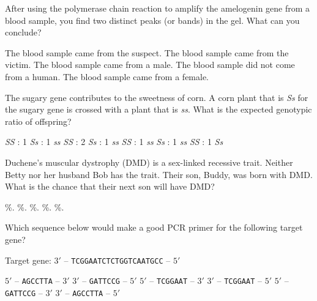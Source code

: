 \question
After using the polymerase chain reaction to amplify the amelogenin gene from a blood sample, you find two distinct peaks (or bands) in the gel.  What can you conclude?

\begin{choices}
\choice The blood sample came from the suspect.
\choice The blood sample came from the victim.
\correctchoice The blood sample came from a male.
\choice The blood sample did not come from a human.
\choice The blood sample came from a female.
\end{choices}

\newpage

\question
The sugary gene contributes to the sweetness of corn. A corn plant that is \textit{Ss} for the sugary gene is crossed with a plant that is \textit{ss}. What is the expected genotypic ratio of offspring?

\begin{choices}
 \textit{SS} : 1 \textit{Ss} : 1 \textit{ss}
 \textit{SS} : 2 \textit{Ss} : 1 \textit{ss}
 \textit{SS} : 1 \textit{ss}
 \textit{Ss} : 1 \textit{ss}
 \textit{SS} : 1 \textit{Ss}
\end{choices}

\question
Duchene's muscular dystrophy (DMD) is a sex-linked recessive trait. Neither Betty nor her husband Bob has the trait. Their son, Buddy, was born with DMD. What is the chance that their next son will have DMD?

\begin{choices}
\%.
\%.
\%.
\%.
\%.
\end{choices}

\question
Which sequence below would make a good PCR primer for the following target gene?

\vspace{0.4\baselineskip}
Target gene: $3'$ -- \texttt{TCGGAATCTCTGGTCAATGCC} -- $5'$

\begin{choices}
\correctchoice $5'$ -- \texttt{AGCCTTA} -- $3'$
\choice $3'$ -- \texttt{GATTCCG} -- $5'$
\choice $5'$ -- \texttt{TCGGAAT} -- $3'$
\choice $3'$ -- \texttt{TCGGAAT} -- $5'$
\choice $5'$ -- \texttt{GATTCCG} -- $3'$
\choice $3'$ -- \texttt{AGCCTTA} -- $5'$
\end{choices}

